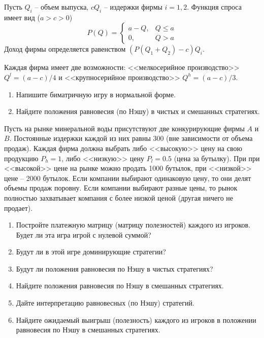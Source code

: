 \begin{exercise}
Пусть $Q_i$ -- объем выпуска, $cQ_i$ --
издержки фирмы $i=1,2$. Функция спроса имеет вид ($a>c>0$)
\[
	P(Q)=\begin{cases}
	a-Q, & Q\leq a \\
	0, & Q>a
	\end{cases}
\]
Доход фирмы определяется равенством $(P(Q_1+Q_2)-c)Q_i$.

Каждая фирма имеет две возможности: <<мелкосерийное производство>>
$Q^l=(a-c)/4$ и <<крупносерийное производство>> $Q^h=(a-c)/3$.
\begin{enumerate}
	\item Напишите биматричную игру в нормальной форме.
	\item Найдите положения равновесия (по Нэшу) в чистых и смешанных
	стратегиях.
\end{enumerate}
\end{exercise}

\begin{exercise}
Пусть на рынке минеральной воды присутствуют две конкурирующие фирмы $A$ и $B$. 
Постоянные издержки каждой из них равны 300
(вне зависимости от объема продаж). Каждая фирма
должна выбрать либо <<высокую>> цену на свою продукцию $P_h=1$, 
либо <<низкую>> цену $P_l=0.5$ (цена за бутылку). При при <<высокой>> цене на 
рынке можно продать 1000 бутылок, при <<низкой>> цене -- 2000 бутылок.
Если компании выбирают одинаковую цену, то они делят объемы продаж поровну.
Если компании выбирают разные цены, то рынок полностью захватывает компания
с более низкой ценой (другая ничего не продает).
\begin{enumerate}
	\item Постройте платежную матрицу (матрицу полезностей) каждого из игроков. 
	Будет ли эта игра игрой с нулевой суммой? %
	\item Будут ли в этой игре доминирующие стратегии? %
	\item Будут ли положения равновесия по Нэшу в чистых стратегиях? %
	\item Найдите положения равновесия по Нэшу в смешанных стратегиях.
	\item Дайте интерпретацию равновесных (по Нэшу) стратегий.
	\item Найдите ожидаемый выигрыш (полезность) каждого из игроков
	в положении равновесия по Нэшу в смешанных стратегиях.
\end{enumerate}
\end{exercise}

